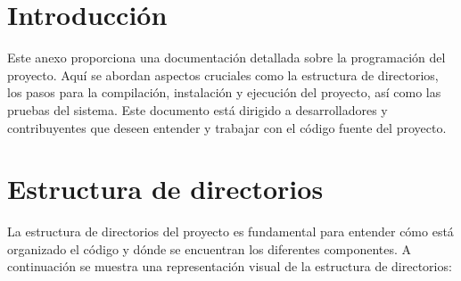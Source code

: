 
\section{Introducción}
Este anexo proporciona una documentación detallada sobre la programación del proyecto. Aquí se abordan aspectos cruciales como la estructura de directorios, los pasos para la compilación, instalación y ejecución del proyecto, así como las pruebas del sistema. Este documento está dirigido a desarrolladores y contribuyentes que deseen entender y trabajar con el código fuente del proyecto.

\section{Estructura de directorios}
La estructura de directorios del proyecto es fundamental para entender cómo está organizado el código y dónde se encuentran los diferentes componentes. A continuación se muestra una representación visual de la estructura de directorios:

